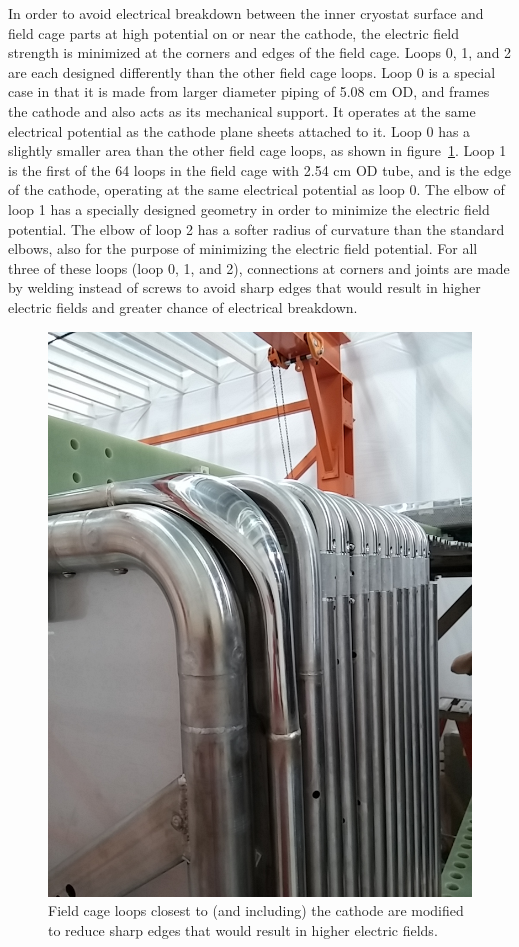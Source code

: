 In order to avoid electrical breakdown between the inner cryostat surface and field cage parts at high potential on or near the cathode, the electric field strength is minimized at the corners and edges of the field cage. Loops 0, 1, and 2 are each designed differently than the other field cage loops.  Loop 0 is a special case in that it is made from larger diameter piping of 5.08 cm OD, and frames the cathode and also acts as its mechanical support.  It operates at the same electrical potential as the cathode plane sheets attached to it.  Loop 0 has a slightly smaller area than the other field cage loops, as shown in figure~\ref{fig:tpc-smooshed-elbow}.  Loop 1 is the first of the 64 loops in the field cage with 2.54 cm OD tube, and is the edge of the cathode, operating at the same electrical potential as loop 0.  The elbow of loop 1 has a specially designed geometry in order to minimize the electric field potential.  The elbow of loop 2 has a softer radius of curvature than the standard elbows, also for the purpose of minimizing the electric field potential. For all three of these loops (loop 0, 1, and 2), connections at corners and joints are made by welding instead of screws to avoid sharp edges that would result in higher electric fields and greater chance of electrical breakdown.

\begin{figure}[htb]
\centering	
\includegraphics[width=0.8\linewidth]{figures/tpc-smooshed-elbow-3.jpg}
\caption{Field cage loops closest to (and including) the cathode are modified to reduce sharp edges that would result in higher electric fields.}
\label{fig:tpc-smooshed-elbow}
\end{figure}

